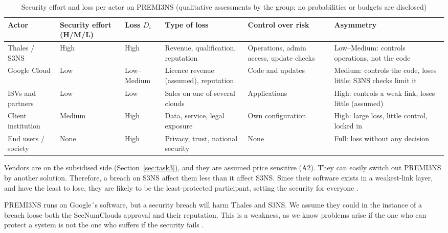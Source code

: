 \begin{table}[ht]
\centering
\small
\caption{Security effort and loss per actor on PREMI3NS (qualitative
assessments by the group; no probabilities or budgets are disclosed)}
\label{tab:cyberloss}
\begin{tabularx}{\linewidth}{>{\raggedright\arraybackslash}p{2.0cm}>{\raggedright\arraybackslash}p{1.8cm}>{\raggedright\arraybackslash}p{1.4cm}YYY}
\toprule
\textbf{Actor} & \textbf{Security effort (H/M/L)} & \textbf{Loss $D_i$} &
\textbf{Type of loss} & \textbf{Control over risk} & \textbf{Asymmetry} \\
\midrule
Thales / S3NS & High & High &
Revenue, qualification, reputation &
Operations, admin access, update checks &
Low--Medium: controls operations, not the code \\
Google Cloud & Low & Low--Medium &
Licence revenue (assumed), reputation &
Code and updates &
Medium: controls the code, loses little; S3NS checks limit it \\
ISVs and partners & Low & Low &
Sales on one of several clouds &
Applications &
High: controls a weak link, loses little (assumed) \\
Client institution & Medium & High &
Data, service, legal exposure &
Own configuration &
High: large loss, little control, locked in \\
End users / society & None & High &
Privacy, trust, national security &
None &
Full: loss without any decision \\
\bottomrule
\end{tabularx}
\end{table}

Vendors are on the subsidised side (Section~\ref{sec:task3}), and they are assumed price sensitive (A2). They can easily switch out PREMI3NS by another solution. Therefore, a breach on S3NS affect them less than it affect S3NS. Since their software exists in a weakest-link layer, and have the least to lose, they are likely to be the least-protected participant, setting the security for everyone \parencite[slide 21]{kianpour2026slides}.

PREMI3NS runs on Google´s software, but a security breach will harm Thales and S3NS. We assume they could in the instance of a breach loose both the SecNumClouds approval and their reputation. This is a weakness, as we know problems arise if the one who can protect a system is not the one who suffers if the security fails \parencite[p.~358]{anderson2001}. 

